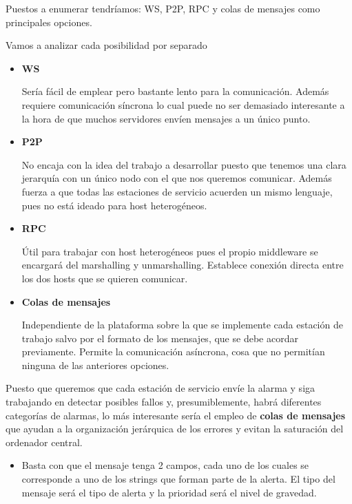 \begin{problem}[13]
      \yoP

      \spart

      Puestos a enumerar tendríamos: WS, P2P, RPC y colas de mensajes como principales opciones.

      \spart

      Vamos a analizar cada posibilidad por separado

      \begin{itemize}
      \item \textbf{WS}

      Sería fácil de emplear pero bastante lento para la comunicación. Además requiere comunicación síncrona lo cual puede no ser demasiado interesante a la hora de que muchos servidores envíen mensajes a un único punto.

      \item \textbf{P2P}

      No encaja con la idea del trabajo a desarrollar puesto que tenemos una clara jerarquía con un único nodo con el que nos queremos comunicar. Además fuerza a que todas las estaciones de servicio acuerden un mismo lenguaje, pues no está ideado para host heterogéneos.

      \item \textbf{RPC}

      Útil para trabajar con host heterogéneos pues el propio middleware se encargará del marshalling y unmarshalling. Establece conexión directa entre los dos hosts que se quieren comunicar.

      \item \textbf{Colas de mensajes}

      Independiente de la plataforma sobre la que se implemente cada estación de trabajo salvo por el formato de los mensajes, que se debe acordar previamente. Permite la comunicación asíncrona, cosa que no permitían ninguna de las anteriores opciones.

      \end{itemize}
    Puesto que queremos que cada estación de servicio envíe la alarma y siga trabajando en detectar posibles fallos y, presumiblemente, habrá diferentes categorías de alarmas, lo más interesante sería el empleo de \textbf{colas de mensajes} que ayudan a la organización jerárquica de los errores y evitan la saturación del ordenador central.

      \spart

      \begin{itemize}
        \item Basta con que el mensaje tenga 2 campos, cada uno de los cuales se corresponde a uno de los strings que forman parte de la alerta. El tipo del mensaje será el tipo de alerta y la prioridad será el nivel de gravedad.


\end{itemize}
\end{problem}

